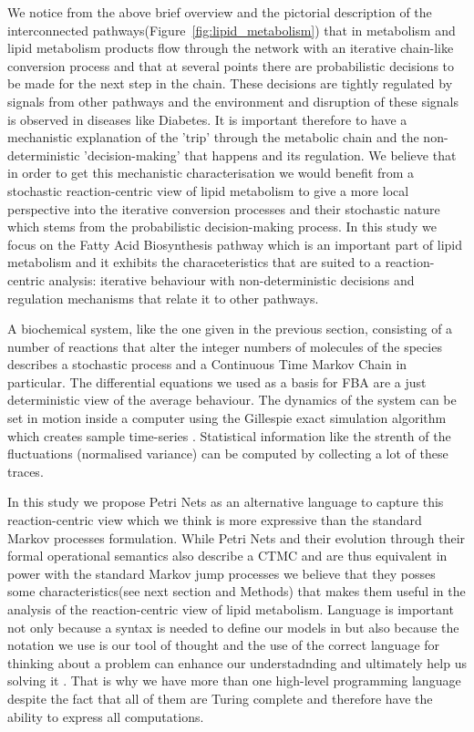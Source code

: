We notice from the above brief overview and the pictorial description
of the interconnected pathways(Figure~\ref{fig:lipid_metabolism}) that
in metabolism and lipid metabolism products flow through the
network with an iterative chain-like conversion process and that at
several points there are probabilistic decisions to be made for the next step in the
chain. These decisions are tightly regulated by signals from other
pathways and the environment and disruption of these signals is
observed in diseases like Diabetes. It is important therefore to have
a mechanistic explanation of the 'trip' through the metabolic chain
and the non-deterministic 'decision-making' that happens and its regulation. We believe
that in order to get this mechanistic characterisation we would
benefit from a stochastic reaction-centric view of lipid metabolism to
give a more local perspective into the iterative conversion processes
and their stochastic nature which stems from the probabilistic
decision-making process. In this study we
focus on the Fatty Acid Biosynthesis pathway which is an important
part of lipid metabolism and it exhibits the characeteristics that are
suited to a reaction-centric analysis: iterative behaviour with
non-deterministic decisions and regulation mechanisms that relate it
to other pathways.

A biochemical system, like the one given in the previous section,
consisting of a number of reactions that alter the integer numbers of
molecules of the species describes a stochastic process and a Continuous
Time Markov Chain in particular. The differential equations we used as
a basis for FBA are a just
deterministic view of the average behaviour. The dynamics of the
system can be set in motion inside a computer using the Gillespie
exact simulation algorithm which creates sample
time-series \cite [] {gillespie1977exact}. Statistical information like the strenth of the
fluctuations (normalised variance) can be computed by collecting a lot
of these traces.

In this study we propose Petri Nets as an alternative language to capture this
reaction-centric view which we think is more expressive than the
standard Markov processes formulation. While Petri Nets and their
evolution through their formal operational semantics also describe a
CTMC and are thus equivalent in power with the standard Markov jump
processes we believe that they posses some characteristics(see next
section and Methods) that makes them useful in the analysis of the
reaction-centric view of lipid metabolism. Language is important not
only because a syntax is needed to define our models in but also because
the notation we use is our tool of thought and the use of the correct
language for thinking about a problem can enhance our understadnding
and ultimately help us solving it \cite [] {iverson2007notation}. That is why we have more
than one high-level programming language despite the fact that all of
them are Turing complete and therefore have the ability to express all
computations.


